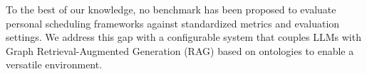 \documentclass[runningheads]{llncs}
\begin{document}


To the best of our knowledge, no benchmark has been proposed to evaluate personal scheduling frameworks against standardized metrics and evaluation settings.
We address this gap with a configurable system that couples LLMs with Graph Retrieval-Augmented Generation (RAG) based on ontologies \citep{zhang_survey_2025} to enable a versatile environment.

\end{document}
